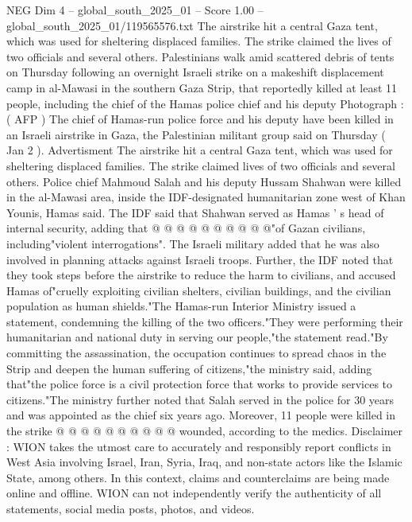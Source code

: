 \begin{textsample}{NEG Dim 4 – global\_south\_2025\_01 – Score 1.00 – global\_south\_2025\_01/119565576.txt}  \label{ex:f4_neg_450}
The airstrike hit a central Gaza tent, which was used for sheltering displaced families.
The strike claimed the lives of two officials and several others.
Palestinians walk amid scattered debris of tents on Thursday following an overnight Israeli strike on a makeshift displacement camp in al-Mawasi in the southern Gaza Strip, that reportedly killed at least 11 people, including the chief of the Hamas police chief and his deputy Photograph : ( AFP ) The chief of Hamas-run police force and his deputy have been killed in an Israeli airstrike in Gaza, the Palestinian militant group said on Thursday ( Jan 2 ).
Advertisment The airstrike hit a central Gaza tent, which was used for sheltering displaced families.
The strike claimed lives of two officials and several others.
Police chief Mahmoud Salah and his deputy Hussam Shahwan were killed in the al-Mawasi area, inside the IDF-designated humanitarian zone west of Khan Younis, Hamas said.
The IDF said that Shahwan served as Hamas ' s head of internal security, adding that @ @ @ @ @ @ @ @ @ @"of Gazan civilians, including"violent interrogations".
The Israeli military added that he was also involved in planning attacks against Israeli troops.
Further, the IDF noted that they took steps before the airstrike to reduce the harm to civilians, and accused Hamas of"cruelly exploiting civilian shelters, civilian buildings, and the civilian population as human shields."The Hamas-run Interior Ministry issued a statement, condemning the killing of the two officers."They were performing their humanitarian and national duty in serving our people,"the statement read."By committing the assassination, the occupation continues to spread chaos in the Strip and deepen the human suffering of citizens,"the ministry said, adding that"the police force is a civil protection force that works to provide services to citizens."The ministry further noted that Salah served in the police for 30 years and was appointed as the chief six years ago.
Moreover, 11 people were killed in the strike @ @ @ @ @ @ @ @ @ @ wounded, according to the medics.
Disclaimer : WION takes the utmost care to accurately and responsibly report conflicts in West Asia involving Israel, Iran, Syria, Iraq, and non-state actors like the Islamic State, among others.
In this context, claims and counterclaims are being made online and offline.
WION can not independently verify the authenticity of all statements, social media posts, photos, and videos.

\end{textsample}
